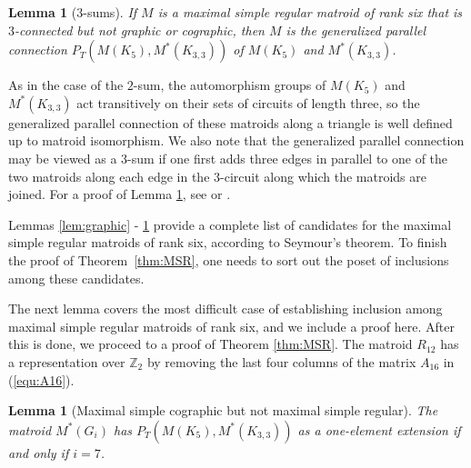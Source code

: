 \documentclass[reqno,12pt]{amsart}
\newtheorem{lemma}[theorem]{Lemma}
\numberwithin{theorem}{section}
\theoremstyle{plain}
\theoremstyle{definition}
\theoremstyle{remark}
\numberwithin{equation}{section}
\numberwithin{table}{section}
\begin{document}
\begin{lemma}[$3$-sums]\label{lem:3sum}
If $M$ is a maximal simple regular matroid of rank six that is $3$-connected but not graphic or cographic, then $M$ is the generalized parallel connection $P_T(M(K_5), M^*(K_{3,3}))$ of $M(K_5)$ and $M^*(K_{3,3})$.
\end{lemma}

As in the case of the $2$-sum, the automorphism groups of $M(K_5)$ and $M^*(K_{3,3})$ act transitively on their sets of circuits of length three, so the generalized parallel connection of these matroids along a triangle is well defined up to matroid isomorphism. We also note that the generalized parallel connection may be viewed as a $3$-sum if one first adds three edges in parallel to one of the two matroids along each edge in the $3$-circuit along which the matroids are joined. For a proof of Lemma \ref{lem:3sum}, see \cite[Page 424]{DanilovGrishukhin99} or \cite[Lemma 97 and Section 6.1]{Israel-PhD}. 

Lemmas \ref{lem:graphic} - \ref{lem:3sum} provide a complete list of candidates for the maximal simple regular matroids of rank six, according to Seymour's theorem. To finish the proof of Theorem~\ref{thm:MSR}, one needs to sort out the poset of inclusions among these candidates. 


The next lemma covers the most difficult case of establishing inclusion among maximal simple regular matroids of rank six, and we include a proof here. After this is done, we proceed to a proof of Theorem \ref{thm:MSR}. The matroid $R_{12}$ has a representation over $\mathbb{Z}_2$ by removing the last four columns of the matrix $A_{16}$ in (\ref{equ:A16}).

\begin{lemma}[Maximal simple cographic but not maximal simple regular]\label{lem:MSCnotMSR}
The matroid $M^*(G_i)$ has $P_T(M(K_5), M^*(K_{3,3}))$ as a one-element extension if and only if $i = 7$.
\end{lemma}
\end{document}
